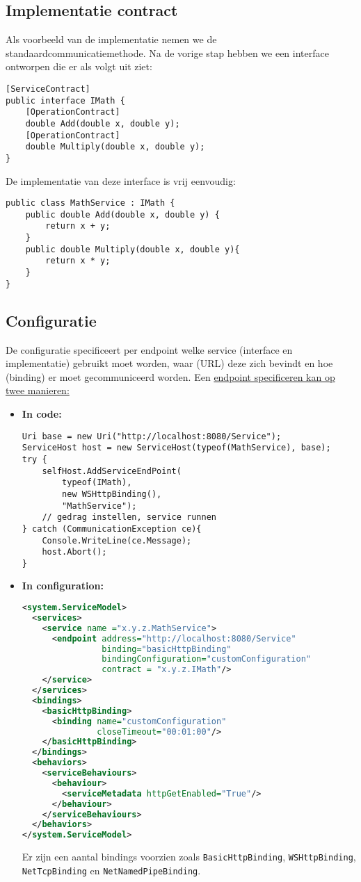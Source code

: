 \documentclass{report}
\begin{document}
\subsection{Implementatie contract}
Als voorbeeld van de implementatie nemen we de standaardcommunicatiemethode. Na de vorige stap hebben we een interface ontworpen die er als volgt uit ziet:
\begin{lstlisting}[style=csharp]
[ServiceContract]
public interface IMath {
	[OperationContract]
	double Add(double x, double y);
	[OperationContract]
	double Multiply(double x, double y);
}
\end{lstlisting}
De implementatie van deze interface is vrij eenvoudig:
\begin{lstlisting}[style=csharp]
public class MathService : IMath {
	public double Add(double x, double y) {
		return x + y;
	}
	public double Multiply(double x, double y){
		return x * y;
	}
}
\end{lstlisting}

\subsection{Configuratie}
De configuratie specificeert per endpoint welke service (interface en implementatie) gebruikt moet worden, waar (URL) deze zich bevindt en hoe (binding) er moet gecommuniceerd worden. Een \underline{endpoint specificeren kan op twee manieren:}
\begin{itemize}
	\item[\info] \textbf{In code:}
	\begin{lstlisting}[style=csharp]
Uri base = new Uri("http://localhost:8080/Service");
ServiceHost host = new ServiceHost(typeof(MathService), base);
try {
	selfHost.AddServiceEndPoint(
		typeof(IMath),
		new WSHttpBinding(),
		"MathService");
	// gedrag instellen, service runnen
} catch (CommunicationException ce){
	Console.WriteLine(ce.Message);
	host.Abort();	
}
	\end{lstlisting}
	\item[\info] \textbf{In configuration:}
	\begin{lstlisting}[language=xml]
<system.ServiceModel>
  <services>
    <service name ="x.y.z.MathService">
      <endpoint address="http://localhost:8080/Service"
                binding="basicHttpBinding"
                bindingConfiguration="customConfiguration"
                contract = "x.y.z.IMath"/>
    </service>
  </services>
  <bindings>
    <basicHttpBinding>
      <binding name="customConfiguration"
               closeTimeout="00:01:00"/>
    </basicHttpBinding>
  </bindings>
  <behaviors>
    <serviceBehaviours>
      <behaviour>
        <serviceMetadata httpGetEnabled="True"/>
      </behaviour>
    </serviceBehaviours>
  </behaviors>
</system.ServiceModel>
	\end{lstlisting}
Er zijn een aantal bindings voorzien zoals \texttt{BasicHttpBinding}, \texttt{WSHttpBinding}, \texttt{NetTcpBinding} en \texttt{NetNamedPipeBinding}.
\end{itemize}
\end{document}
